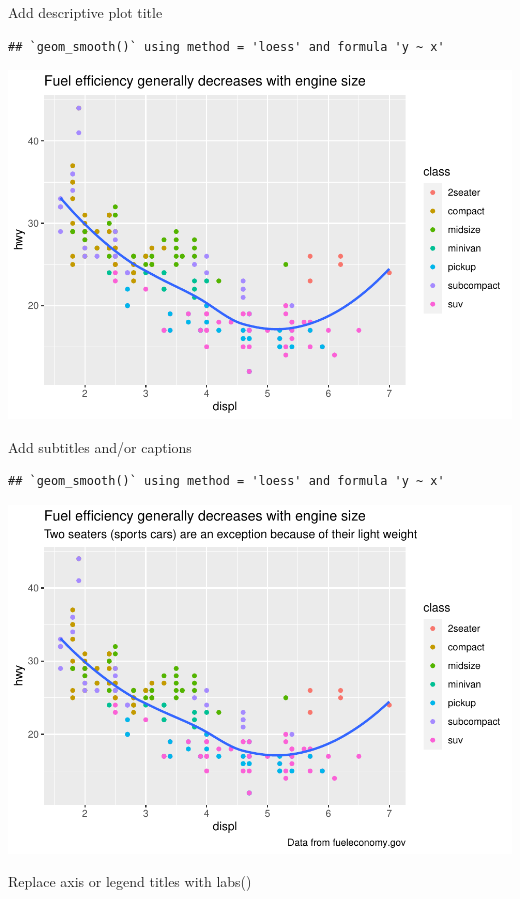 \documentclass[
]{article}
\begin{document}
Add descriptive plot title

\begin{verbatim}
## `geom_smooth()` using method = 'loess' and formula 'y ~ x'
\end{verbatim}

\includegraphics{rmarkdown_tutorial_files/figure-latex/unnamed-chunk-11-1.pdf}

Add subtitles and/or captions

\begin{verbatim}
## `geom_smooth()` using method = 'loess' and formula 'y ~ x'
\end{verbatim}

\includegraphics{rmarkdown_tutorial_files/figure-latex/unnamed-chunk-12-1.pdf}

Replace axis or legend titles with labs()
\end{document}
